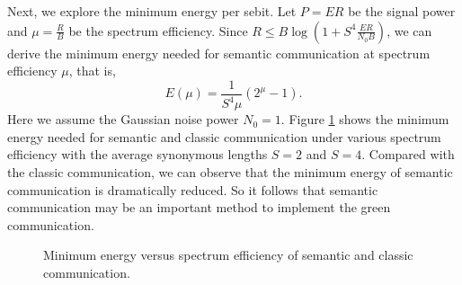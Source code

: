 \documentclass[12pt, draftclsnofoot,onecolumn]{IEEEtran}
\begin{document}
Next, we explore the minimum energy per sebit. Let $P=ER$ be the signal power and $\mu=\frac{R}{B}$ be the spectrum efficiency. Since $R\leq B\log(1+S^4\frac{ER}{N_0 B})$, we can derive the minimum energy needed for semantic communication at spectrum efficiency $\mu$, that is,
\begin{equation}
E(\mu)=\frac{1}{S^4\mu}(2^{\mu}-1).
\end{equation}
Here we assume the Gaussian noise power $N_0=1$. Figure \ref{Energyl_comp} shows the minimum energy needed for semantic and classic communication under various spectrum efficiency with the average synonymous lengths $S=2$ and $S=4$. Compared with the classic communication, we can observe that the minimum energy of semantic communication is dramatically reduced. So it follows that semantic communication may be an important method to implement the green communication.

\begin{figure}[htbp]
\setlength{\abovecaptionskip}{0.cm}
\setlength{\belowcaptionskip}{-0.cm}
  \caption{Minimum energy versus spectrum efficiency of semantic and classic communication.}\label{Energyl_comp}
\end{figure}
\end{document}
